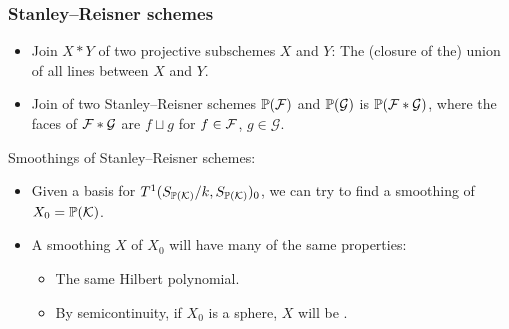 \begin{frame}
\frametitle{Stanley--Reisner schemes}

\begin{itemize}
	\item
	\alert{Join} $X \ast Y$ of two projective subschemes $X$ and $Y$: The (closure of the) union of all lines between $X$ and $Y$.
	\pause

	\item
	\alert{Join} of two Stanley--Reisner schemes $\P(\F)$ and $\P(\mathcal G)$ is $\P(\F \ast \mathcal G)$, where the faces of $\F  \ast \mathcal G$ are $f \sqcup g$ for $f \in \F$, $g \in \mathcal G$.
\end{itemize}

\pause

Smoothings of Stanley--Reisner schemes:

\begin{itemize}
	\item Given a basis for $T^1(S_{\P(\K)}/k,S_{\P(\K)})_0$, we can try to find a smoothing of $X_0 = \P(\K)$.
	\pause
	\item A smoothing $X$ of $X_0$ will have many of the same properties:
		\begin{itemize}
			\item The same Hilbert polynomial.
			\item By semicontinuity, if $X_0$ is a sphere, $X$ will be \CY. %
		\end{itemize}
\end{itemize}


\end{frame}
